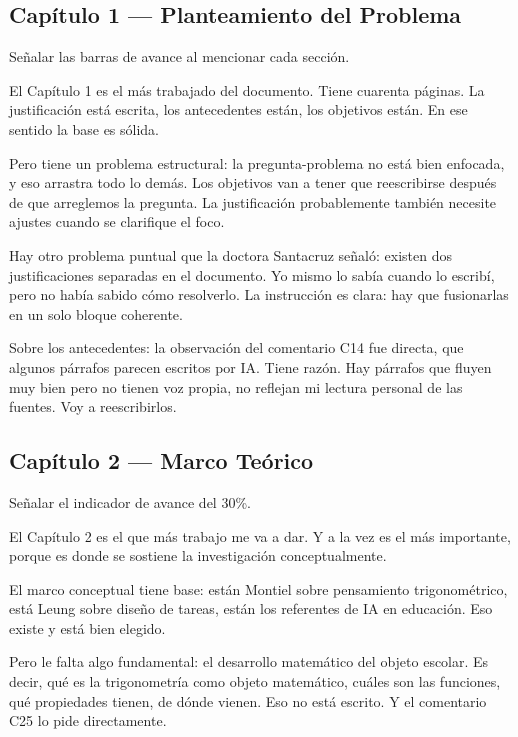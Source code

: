 \documentclass[11pt, letterpaper]{article}
\newenvironment{accion}{%
  \par\smallskip
  \color{GrisAnotacion}\small\itshape\faHandPointRight\enspace
}{%
  \par\smallskip\normalcolor\normalsize\normalfont
}
\begin{document}
\subsection{Capítulo 1 — Planteamiento del Problema}

\begin{accion}
  Señalar las barras de avance al mencionar cada sección.
\end{accion}

El Capítulo 1 es el más trabajado del documento. Tiene cuarenta páginas. La justificación está escrita, los antecedentes están, los objetivos están. En ese sentido la base es sólida.

Pero tiene un problema estructural: la pregunta-problema no está bien enfocada, y eso arrastra todo lo demás. Los objetivos van a tener que reescribirse después de que arreglemos la pregunta. La justificación probablemente también necesite ajustes cuando se clarifique el foco.

Hay otro problema puntual que la doctora Santacruz señaló: existen dos justificaciones separadas en el documento. Yo mismo lo sabía cuando lo escribí, pero no había sabido cómo resolverlo. La instrucción es clara: hay que fusionarlas en un solo bloque coherente.

Sobre los antecedentes: la observación del comentario C14 fue directa, que algunos párrafos parecen escritos por IA. Tiene razón. Hay párrafos que fluyen muy bien pero no tienen voz propia, no reflejan mi lectura personal de las fuentes. Voy a reescribirlos.

\subsection{Capítulo 2 — Marco Teórico}

\begin{accion}
  Señalar el indicador de avance del 30\%.
\end{accion}

El Capítulo 2 es el que más trabajo me va a dar. Y a la vez es el más importante, porque es donde se sostiene la investigación conceptualmente.

El marco conceptual tiene base: están Montiel sobre pensamiento trigonométrico, está Leung sobre diseño de tareas, están los referentes de IA en educación. Eso existe y está bien elegido.

Pero le falta algo fundamental: el desarrollo matemático del objeto escolar. Es decir, qué es la trigonometría como objeto matemático, cuáles son las funciones, qué propiedades tienen, de dónde vienen. Eso no está escrito. Y el comentario C25 lo pide directamente.
\end{document}
